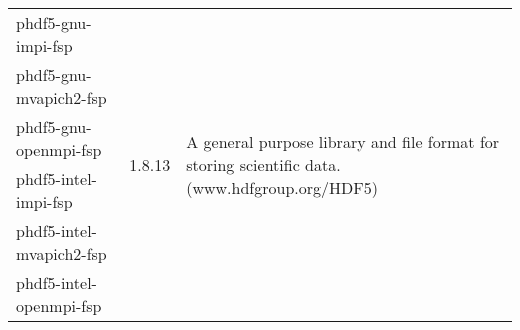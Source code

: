 \begin{tabularx}{\textwidth}{l|c|X}
phdf5-gnu-impi-fsp & 
\multirow{6}{*}{1.8.13} & 
\multirow{6}{\linewidth}{A general purpose library and file format for storing scientific data. \newline (www.hdfgroup.org/HDF5)} \\ 
phdf5-gnu-mvapich2-fsp & 
& \\ 
phdf5-gnu-openmpi-fsp & 
& \\ 
phdf5-intel-impi-fsp & 
& \\ 
phdf5-intel-mvapich2-fsp & 
& \\ 
phdf5-intel-openmpi-fsp & 
& \\ 
\hline

\bottomrule
\end{tabularx}
